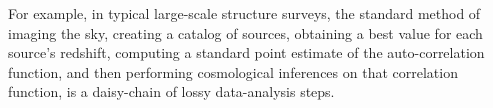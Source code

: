 \documentclass[12pt]{article}
\begin{document}
\sloppy\sloppypar

For example, in typical large-scale structure surveys, the standard
method of imaging the sky, creating a catalog of sources, obtaining a
best value for each source's redshift, computing a standard point
estimate of the auto-correlation function, and then performing
cosmological inferences on that correlation function, is a daisy-chain
of lossy data-analysis steps.
\end{document}

